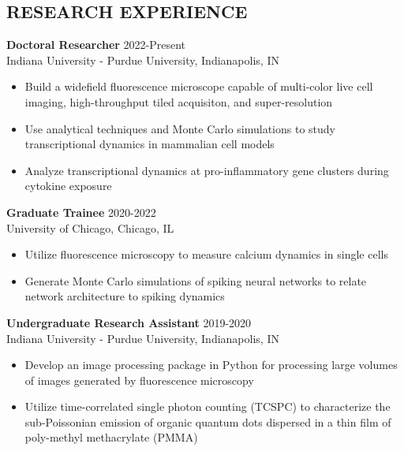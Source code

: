 \documentclass[margin, 10pt]{res} %
\begin{document}
\begin{resume}
\section{RESEARCH EXPERIENCE}

\textbf{Doctoral Researcher} \hfill 2022-Present \\
Indiana University - Purdue University, Indianapolis, IN

\begin{itemize} \itemsep -2pt %

\item Build a widefield fluorescence microscope capable of multi-color live cell imaging, high-throughput tiled acquisiton, and super-resolution

\item Use analytical techniques and Monte Carlo simulations to study transcriptional dynamics in mammalian cell models

\item Analyze transcriptional dynamics at pro-inflammatory gene clusters during cytokine exposure
 
\end{itemize}

\textbf{Graduate Trainee} \hfill 2020-2022 \\
University of Chicago, Chicago, IL

\begin{itemize} \itemsep -2pt %

\item Utilize fluorescence microscopy to measure calcium dynamics in single cells
\item Generate Monte Carlo simulations of spiking neural networks to relate network architecture to spiking dynamics
 
\end{itemize}
 
\textbf{Undergraduate Research Assistant} \hfill 2019-2020\\
Indiana University - Purdue University, Indianapolis, IN
\begin{itemize} \itemsep -2pt %

\item Develop an image processing package in Python for processing large volumes of images generated by fluorescence microscopy

\item Utilize time-correlated single photon counting (TCSPC) to characterize the sub-Poissonian emission of organic quantum dots dispersed in a thin film of poly-methyl methacrylate (PMMA)


\end{itemize}
\end{resume}
\end{document}
